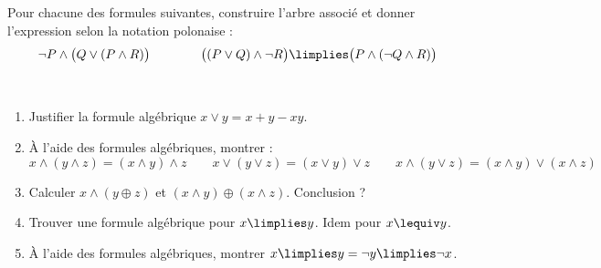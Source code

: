 \documentclass[11pt,class=report,crop=false]{standalone}
\begin{document}
\begin{exercicecours}
	Pour chacune des formules suivantes, construire l'arbre associé et donner l'expression selon la notation polonaise :
	\[
	\lnot P \land \big( Q \lor (P \land R)\big) \qquad\qquad
	\big( (P \lor Q) \land \lnot R \big) \limplies \big( P \land (\lnot Q \land R) \big)
	\]
\end{exercicecours}

\begin{exercicecours}
	~
	\begin{enumerate}
		\item Justifier la formule algébrique $x \lor y = x+y-xy$.
		
		\item À l'aide des formules algébriques, montrer :
		\[ x \land (y \land z) = (x \land y) \land z \qquad
		x \lor (y \lor z) = (x \lor y) \lor z\qquad
		x \land (y \lor z) = (x \land y) \lor (x \land z)
		\]
		
		\item Calculer $x \land (y \oplus z)$ et $(x \land y) \oplus (x \land z)$. Conclusion ?
		
		\item Trouver une formule algébrique pour $x \limplies y$. Idem pour $x \lequiv y$.
		
		\item À l'aide des formules algébriques, montrer $x \limplies y = \lnot y \limplies \lnot x$.
	\end{enumerate}	
\end{exercicecours}
\end{document}
